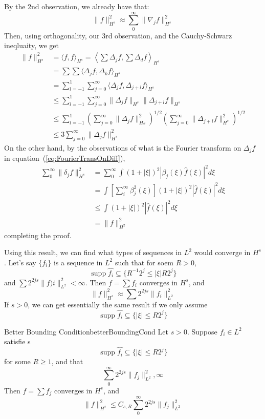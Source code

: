 \documentclass{book}
\newenvironment{Proof}[1][]
  {\begin{ProofTcb}[#1]}
  {\end{ProofTcb}}
\newcommand{\sse}{\subseteq}
\newcommand{\supp}{\operatorname{supp}}
\begin{document}
\begin{Proof}
	By the 2nd observation, we already have that:
	\[
		\|f\|_{H^s}^2 \approx \sum_0^\infty \|\nabla_j f\|_{H^s}^2
	\]
	Then, using orthogonality, our 3rd observation, and the Cauchy-Schwarz ineqluaity, we get
	\begin{align*}
		\|f\|_{H^s}^2 &= \langle f,f\rangle_{H^s} = \left\langle \sum \Delta_j f, \sum \Delta_d f\right\rangle_{H^s}\\
					  &= \sum\sum \langle \Delta_j f, \Delta_k f\rangle_{H^s}\\
					  &= \sum_{l=-1}^1\sum_{j=0}^\infty \langle \Delta_j f, \Delta_{j+l}f \rangle_{H^s}\\
					  &\le \sum_{l=-1}^1\sum_{j=0}^\infty \|\Delta_j f\|_{H^s}\|\Delta_{j+l} f\|_{H^s}\\
					  &\le \sum_{l=-1}^1 \left(\sum_{j=0}^\infty \|\Delta_j f\|_{Hs}^2\right)^{1/2} \left(\sum_{j=0}^\infty \|\Delta_{j+l} f\|_{H^s}^2\right)^{1/2}\\
					  &\le 3 \sum_{j=0}^\infty \|\Delta_j f\|_{H^s}^2
	\end{align*}
	On the other hand, by the observations of what is the Fourier transform on $\Delta_j f$ in
	equation~(\ref{eq:FourierTransOnDiff}),
	\begin{align*}
		\sum_0^\infty \|\delta_j f\|_{H^s}^2 &= \sum_0^\infty \int(1
		+ |\xi|)^2|\beta_j(\xi)\hat{f}(\xi)|^2d\xi\\
											 &= \int \left[
											 \sum_i^\infty
										 \beta_j^2(\xi)\right]
										 (1+|\xi|)^2|\hat{f}(\xi)|^2d\xi\\
											 &\le \int (1+|\xi|)^2
										 |\hat{f}(\xi)|^2d\xi\\
											 &= \|f\|_{H^2}^2
	\end{align*}
	completing the proof.
\end{Proof}

Using this result, we can find what types of sequences in $L^2$ would converge in $H^s$. Let's say $\{f_i\}$ is
a sequence in $L^2$ such that for soem $R > 0$,
\[
	\supp \hat{f_i} \sse \{ R^{-1}2^j \le |\xi| R2^j\}
\]
and $\sum 2^{2js} \|f)i\|_{L^2}^2 < \infty$. Then $f = \sum f_i$ converges in $H^s$, and
\[
	\|f\|_{H^s}^2 \approx \sum 2^{2js} \|f_i\|_{L^2}^2
\]
If $s > 0$, we can get essentially the same result if we only assume
\[
	\supp \hat{f_i} \sse \{|\xi| \le R2^j\}
\]

\begin{prop}{Better Bounding Condition}{betterBoundingCond}
	Let $s > 0$. Suppose $f_i\in L^2$ satisfie s
	\[
		\supp \hat{f_i} \sse \{|\xi| \le R2^j\}
	\]
	for some $R \ge 1$, and that
	\[
		\sum_0^\infty 2^{2js} \|f_j\|_{L^2}^2 , \infty
	\]
	Then $f = \sum f_j$ converges in $H^s$, and
	\[
		\|f\|_{H^s}^2 \le C_{s, R} \sum_0^\infty 2^{2js} \|f_j\|_{L^2}^2
	\]
\end{prop}
\end{document}
